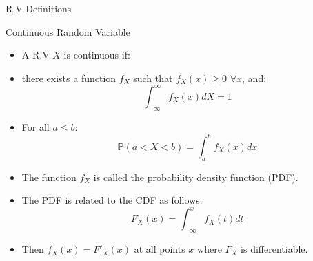 \documentclass[handout]{beamer}
\begin{document}
\begin{frame}{R.V Definitions}
\scriptsize{
\begin{block}{Continuous Random Variable}
\begin{itemize}
 \item A R.V $X$ is continuous if:
 \item there exists a function  $f_{X}$ such that $f_{X}(x) \geq 0$ $\forall x$, and:
 \begin{displaymath}
      \int_{-\infty}^{\infty}f_{X}(x)dX=1
       \end{displaymath}
\item For all $a \leq b$:
\begin{displaymath}
 \mathbb{P}(a < X < b) = \int_{a}^{b} f_{X}(x)dx
\end{displaymath}
\end{itemize}

\end{block}

\begin{itemize}
 \item The function $f_{X}$ is called the probability density function (PDF). 
 \item The PDF is related to the CDF as follows:
 \begin{displaymath}
 F_{X}(x)=\int_{-\infty}^{x}f_{X}(t)dt 
 \end{displaymath}
\item Then $f_{X}(x) = F'_X(x)$ at all points $x$ where $F_{X}$ is differentiable.
\end{itemize}

}
\end{frame}
\end{document}
